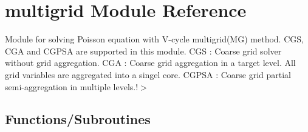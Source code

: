 \hypertarget{namespacemultigrid}{}\section{multigrid Module Reference}
\label{namespacemultigrid}


Module for solving Poisson equation with V-\/cycle multigrid(\+M\+G) method.  C\+GS, C\+GA and C\+G\+P\+SA are supported in this module. C\+GS \+: Coarse grid solver without grid aggregation. C\+GA \+: Coarse grid aggregation in a target level. All grid variables are aggregated into a singel core. C\+G\+P\+SA \+: Coarse grid partial semi-\/aggregation in multiple levels.!$>$  


\subsection*{Functions/\+Subroutines}
